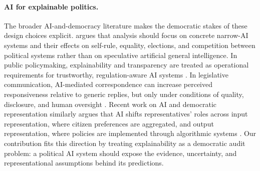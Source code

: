 \documentclass[letterpaper]{article}
\begin{document}
\paragraph{AI for explainable politics.}
The broader AI-and-democracy literature makes the democratic stakes of these design choices explicit. \citet{jungherr2023artificialIntelligenceDemocracy} argues that analysis should focus on concrete narrow-AI systems and their effects on self-rule, equality, elections, and competition between political systems rather than on speculative artificial general intelligence. In public policymaking, explainability and transparency are treated as operational requirements for trustworthy, regulation-aware AI systems \citep{papadakis2024explainableTransparentAI}. In legislative communication, AI-mediated correspondence can increase perceived responsiveness relative to generic replies, but only under conditions of quality, disclosure, and human oversight \citep{kreps2023aiCommunicationTools}. Recent work on AI and democratic representation similarly argues that AI shifts representatives' roles across input representation, where citizen preferences are aggregated, and output representation, where policies are implemented through algorithmic systems \citep{rymon2026peopleAlgorithm}. Our contribution fits this direction by treating explainability as a democratic audit problem: a political AI system should expose the evidence, uncertainty, and representational assumptions behind its predictions.
\end{document}

